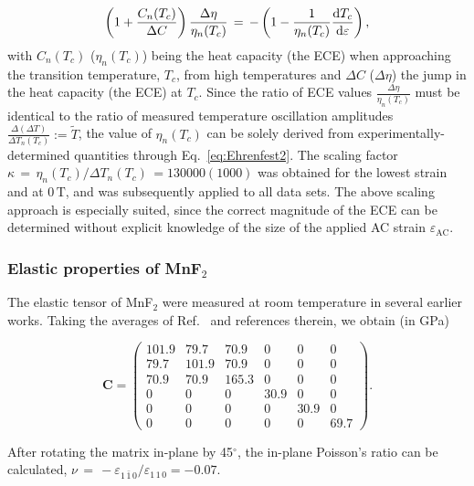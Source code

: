 \documentclass[
 reprint,










 amsmath,amssymb,
 aps,






]{revtex4-2}
\begin{document}
\begin{equation}
    \left( 1+\frac{C_n (T_c)}{\Delta C}\right) \frac{\Delta \eta}{\eta_n (T_c)}\,=\, -\left(1-\frac{1}{\eta_n(T_c)} \frac{\textnormal{d}T_c}{\textnormal{d}\varepsilon}\right),
    \label{eq:Ehrenfest2}
\end{equation}
with $C_n(T_c)$ ($\eta_n(T_c)$) being the heat capacity (the ECE) when approaching the transition temperature, $T_c$, from high temperatures and $\Delta C$ ($\Delta \eta$) the jump in the heat capacity (the ECE) at $T_c$. Since the ratio of ECE values $\frac{\Delta \eta}{\eta_n (T_c)}$ must be identical to the ratio of measured temperature oscillation amplitudes $\frac{\Delta (\Delta T)}{\Delta T_n (T_c)}:=\tilde{T}$, the value of $\eta_n (T_c)$ can be solely derived from experimentally-determined quantities through Eq.~\eqref{eq:Ehrenfest2}. The scaling factor $\kappa\,=\,\eta_n (T_c)/\Delta T_n (T_c)\,=130000(1000)$ was obtained for the lowest strain and at $0\,\mathrm{T}$, and was subsequently applied to all data sets. The above scaling approach is especially suited, since the correct magnitude of the ECE can be determined without explicit knowledge of the size of the applied AC strain $\varepsilon_\textrm{AC}$.

\subsubsection{Elastic properties of MnF$_2$}



The elastic tensor of MnF$_2$ were measured at room temperature in several earlier works. Taking the averages of Ref.~\cite{Har72} and references therein, we obtain (in GPa)

\begin{equation}
\mathbf{C} =
 \begin{pmatrix}
  101.9 & 79.7 & 70.9 &   0    &   0    &   0    \\
  79.7 & 101.9 & 70.9 &   0    &   0    &   0    \\
  70.9 & 70.9 & 165.3 &   0    &   0    &   0    \\
    0    &   0    &   0    & 30.9 &   0    &   0    \\
    0    &   0    &   0    &   0    & 30.9 &   0    \\
    0    &   0    &   0    &   0    &   0    & 69.7
\end{pmatrix}.
\end{equation}

After rotating the matrix in-plane by 45$^\circ$, the in-plane Poisson's ratio can be calculated, $\nu\,=\,-\varepsilon_{1\,\bar{1}\,0}/\varepsilon_{1\,1\,0}=-0.07$.
\end{document}
